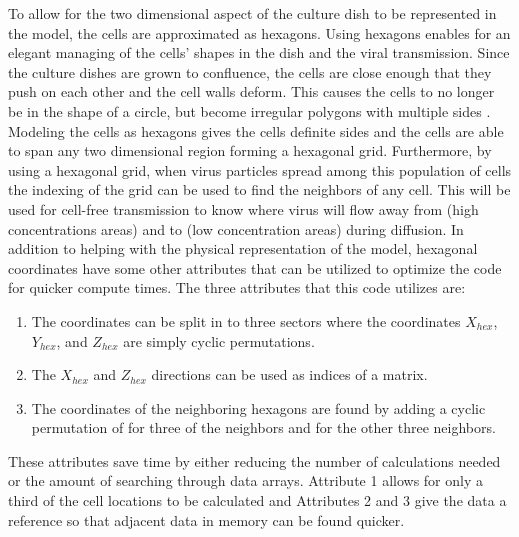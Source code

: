To allow for the two dimensional aspect of the culture dish to be represented in the model, the cells are approximated as hexagons. Using hexagons enables for an elegant managing of the cells' shapes in the dish and the viral transmission. Since the culture dishes are grown to confluence, the cells are close enough that they push on each other and the cell walls deform. This causes the cells to no longer be in the shape of a circle, but become irregular polygons with multiple sides \citep{bruckner_importance_2018}. Modeling the cells as hexagons gives the cells definite sides and the cells are able to span any two dimensional region forming a hexagonal grid. Furthermore, by using a hexagonal grid, when virus particles spread among this population of cells the indexing of the grid can be used to find the neighbors of any cell. This will be used for cell-free transmission to know where virus will flow away from (high concentrations areas) and to (low concentration areas) during diffusion. In addition to helping with the physical representation of the model, hexagonal coordinates have some other attributes that can be utilized to optimize the code for quicker compute times. The three attributes that this code utilizes are:
\begin{enumerate} 
    \item The coordinates can be split in to three sectors where the coordinates $X_{hex}$, $Y_{hex}$, and $Z_{hex}$ are simply cyclic permutations.
    \item The $X_{hex}$ and $Z_{hex}$ directions can be used as indices of a matrix.
    \item The coordinates of the neighboring hexagons are found by adding a cyclic permutation of 
        \scalebox{0.8}{%
        $\left [
            \begin{array}{c}
                1 \\
                0 \\
                -1\\
            \end{array}
        \right ]$}
        for three of the neighbors and
        \scalebox{0.8}{%
        $\left [ 
            \begin{array}{c}
                1 \\
                -1 \\
                0\\
            \end{array}
        \right ]$}
        for the other three neighbors.
\end{enumerate}
These attributes save time by either reducing the number of calculations needed or the amount of searching through data arrays. Attribute 1 allows for only a third of the cell locations to be calculated and Attributes 2 and 3 give the data a reference so that adjacent data in memory can be found quicker.

